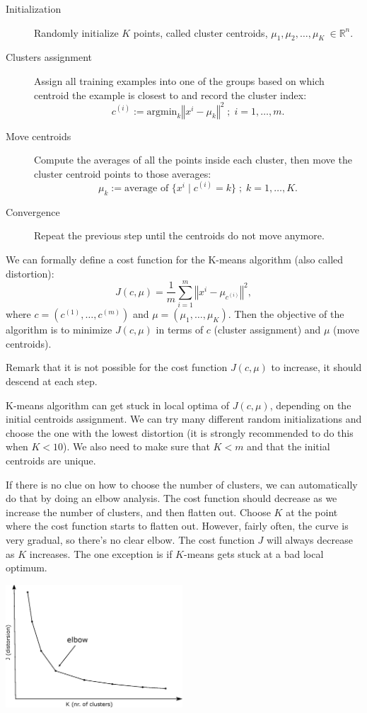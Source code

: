 \documentclass[a4paper,11pt]{report}
\newcommand{\norm}[1]{\left\Vert#1\right\Vert}
\begin{document}
\begin{description}
  \item[Initialization] Randomly initialize $K$ points, called cluster centroids, $\mu_1, \mu_2, \ldots, \mu_K\ \in \mathbb{R}^n$.
  \item[Clusters assignment] Assign all training examples into one of the groups based on which centroid the example is closest to and record the cluster index:
  $$c^{(i)} := \text{argmin}_{k}{\norm{x^i - \mu_k}^2}\; ; \; i=1,\ldots,m. $$
  \item[Move centroids] Compute the averages of all the points inside each cluster, then move the cluster centroid points to those averages:
  $$\mu_k := \text{average of } \{x^i \;|\; c^{(i)} = k\}\; ; \; k=1,\ldots,K.$$
  \item[Convergence] Repeat the previous step until the centroids do not move anymore.
\end{description}

We can formally define a cost function for the K-means algorithm (also called distortion):
$$J(c, \mu) = \dfrac{1}{m} \sum_{i=1}^{m}{\norm{x^i - \mu_{c^{(i)}}}^2},$$ where $c = (c^{(1)}, \ldots, c^{(m)})$ and $\mu = (\mu_1, \ldots, \mu_K)$.
Then the objective of the algorithm is to minimize $J(c, \mu)$ in terms of $c$ (cluster assignment) and $\mu$ (move centroids).

Remark that it is not possible for the cost function $J(c, \mu)$ to increase, it should descend at each step.

K-means algorithm can get stuck in local optima of $J(c, \mu)$, depending on the initial centroids assignment. We can try many different random initializations and choose the one with the lowest distortion (it is strongly recommended to do this when $K<10$). We also need to make sure that $K < m$ and that the initial centroids are unique.

If there is no clue on how to choose the number of clusters, we can automatically do that by doing an elbow analysis.  The cost function should decrease as we increase the number of clusters, and then flatten out. Choose $K$ at the point where the cost function starts to flatten out. However, fairly often, the curve is very gradual, so there's no clear elbow. The cost function $J$ will always decrease as $K$ increases. The one exception is if $K$-means gets stuck at a bad local optimum.

\hspace{1.0in}
\begin{center}
\includegraphics[height = 1.8in]{Images/elbow}
\end{center}
\end{document}
